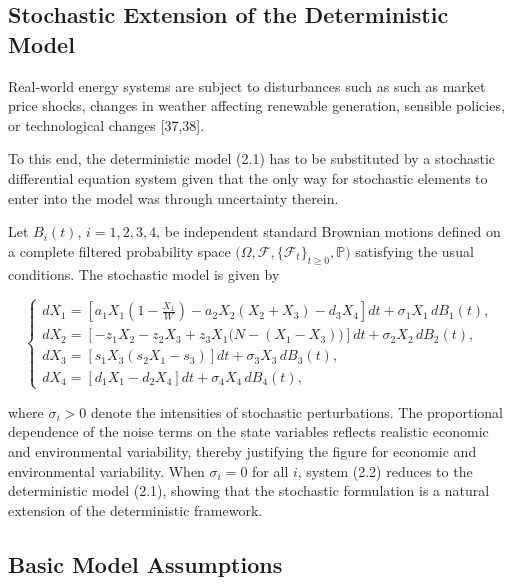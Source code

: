 \documentclass[11pt]{article}
\numberwithin{equation}{section}
\begin{document}
\subsection{Stochastic Extension of the Deterministic Model}

Real-world energy systems are subject to disturbances such as such as market price shocks, changes in weather affecting renewable generation, sensible policies, or technological changes [37,38].

To this end, the deterministic model (2.1) has to be substituted by a stochastic differential equation system given that the only way for stochastic elements to enter into the model was through uncertainty therein.

Let $B_i(t)$, $i = 1,2,3,4$, be independent standard Brownian motions defined on a complete filtered probability space 
$\big(\Omega, \mathcal{F}, \{\mathcal{F}_t\}_{t \ge 0}, \mathbb{P}\big)$ satisfying the usual conditions. 
The stochastic model is given by

\begin{equation}\tag{2.2}\label{eq:stochastic_model}
\begin{cases}
\displaystyle 
dX_1 = \left[ a_1 X_1\left(1-\frac{X_1}{W}\right) 
- a_2 X_2 (X_2 + X_3) 
- d_3 X_4 \right] dt 
+ \sigma_1 X_1 \, dB_1(t), \\[3mm]

\displaystyle 
dX_2 = \left[ - z_1 X_2 
- z_2 X_3 
+ z_3 X_1 \big(N - (X_1 - X_3)\big) \right] dt 
+ \sigma_2 X_2 \, dB_2(t), \\[3mm]

\displaystyle 
dX_3 = \left[ s_1 X_3 (s_2 X_1 - s_3) \right] dt 
+ \sigma_3 X_3 \, dB_3(t), \\[3mm]

\displaystyle 
dX_4 = \left[ d_1 X_1 - d_2 X_4 \right] dt 
+ \sigma_4 X_4 \, dB_4(t),
\end{cases}
\end{equation}

\noindent where $\sigma_i > 0$ denote the intensities of stochastic perturbations.
The proportional dependence of the noise terms on the state variables reflects realistic economic and environmental variability, thereby justifying the figure for economic and environmental variability. 
When $\sigma_i = 0$ for all $i$, system (2.2) reduces to the deterministic model (2.1), showing that the stochastic formulation is a natural extension of the deterministic framework.

\subsection{Basic Model Assumptions}
\end{document}
